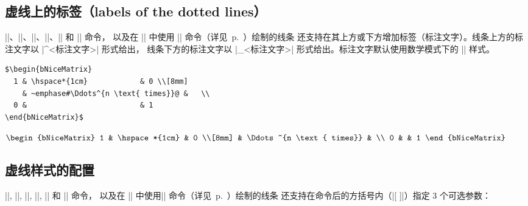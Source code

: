 \documentclass[dvipsnames]{article}%
\begin{document}
\subsection{虚线上的标签（labels of the dotted lines）}

|\Ldots|、|\Cdots|、|\Vdots|、|\Ddots|、|\Iddots| 和 |\Hdotsfor| 命令，
以及在 |\CodeAfter| 中使用 |\line| 命令（详见~p.~\pageref{line-in-code-after}）绘制的线条
还支持在其上方或下方增加标签（标注文字）。线条上方的标注文字以 |^{<标注文字>}| 形式给出，
线条下方的标注文字以 |_{<标注文字>}| 形式给出。标注文字默认使用数学模式下的 |\scriptstyle| 样式。

\bigskip
\begin{BVerbatim}[baseline=c,boxwidth=10cm]
$\begin{bNiceMatrix}
  1 & \hspace*{1cm}            & 0 \\[8mm]
    & ~emphase#\Ddots^{n \text{ times}}@ &   \\
  0 &                          & 1 
\end{bNiceMatrix}$
\end{BVerbatim}
$\begin{bNiceMatrix}
1 & \hspace*{1cm}            & 0 \\[8mm]
 & \Ddots^{n \text{ times}} &   \\
0 &                          & 1 
\end{bNiceMatrix}$

\subsection{虚线样式的配置}

\label{customisation} 
|\Ldots|, |\Cdots|, |\Vdots|, |\Ddots|, |\Iddots| 和 |\Hdotsfor| 命令，
以及在 |\CodeAfter| 中使用|\line| 命令（详见~p.~\pageref{line-in-code-after}）绘制的线条
还支持在命令后的方括号内（|[ ]|）指定 3 个可选参数：
\end{document}
